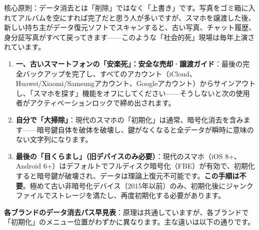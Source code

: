 


核心原則：データ消去とは「削除」ではなく「上書き」です。写真をゴミ箱に入れてアルバムを空にすれば完了だと思う人が多いですが、スマホを譲渡した後、新しい持ち主がデータ復元ソフトでスキャンすると、古い写真、チャット履歴、身分証写真がすべて戻ってきます——このような「社会的死」現場は毎年上演されています。

\begin{enumerate}
  \item \textbf{一、古いスマートフォンの「安楽死」：安全な売却·譲渡ガイド}：最後の完全バックアップを完了し、すべてのアカウント（iCloud、Huawei/Xiaomi/Samsungアカウント、Googleアカウント）からサインアウトし、「スマホを探す」機能をオフにしてください——そうしないと次の使用者がアクティベーションロックで締め出されます。
  \item \textbf{自分で「大掃除」}：現代のスマホの「初期化」は通常、暗号化消去を含みます——暗号鍵自体を破体を破壊し、鍵がなくなると全データが瞬時に意味のない文字列になります。
  \item \textbf{最後の「目くらまし」（旧デバイスのみ必要）}：現代のスマホ（iOS 8+、Android 6+）はデフォルトでフルディスク暗号化（FBE）が有効で、初期化すると暗号鍵が破壊され、データは理論上復元不可能です。\textbf{この手順は不要}。極めて古い非暗号化デバイス（2015年以前）のみ、初期化後にジャンクファイルでストレージを満たし、再度初期化する必要があります。
\end{enumerate}

\textbf{各ブランドのデータ消去パス早見表}：原理は共通していますが、各ブランドで「初期化」のメニュー位置がわずかに異なります。主な違いは以下の通りです。

